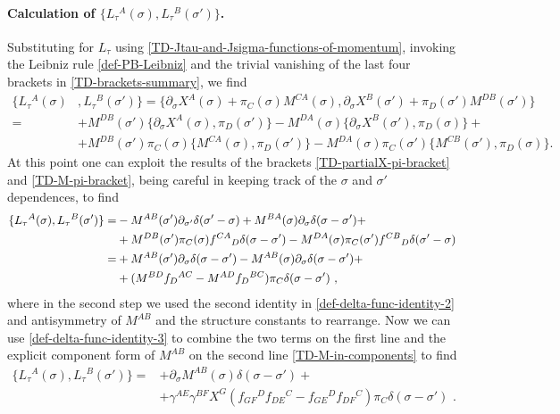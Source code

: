 \documentclass[12pt]{article}
\numberwithin{equation}{section}
\begin{document}
\paragraph{Calculation of $\{ L_{\tau}{}^{A}(\sigma),L_{\tau}{}^{B}(\sigma') \}$.} Substituting for $L_{\tau}$ using \eqref{TD-Jtau-and-Jsigma-functions-of-momentum}, invoking the Leibniz rule \eqref{def-PB-Leibniz} and the trivial vanishing of the last four brackets in \eqref{TD-brackets-summary}, we find
\begin{equation}
\begin{aligned}
\!\!\{ L_{\tau}{}^{A}(\sigma)&,L_{\tau}{}^{B}(\sigma') \} = \{\partial_{\sigma}X^{A}(\sigma)+\pi_{C}(\sigma)M^{CA}(\sigma) , \partial_{\sigma}X^{B}(\sigma')+\pi_{D}(\sigma')M^{DB}(\sigma') \}
\\
=& +M^{DB}(\sigma')\{ \partial_{\sigma}X^{A}(\sigma), \pi_{D}(\sigma') \}-M^{DA}(\sigma)\{ \partial_{\sigma}X^{B}(\sigma'), \pi_{D}(\sigma) \}+
\\&+M^{DB}(\sigma')\pi_{C}(\sigma)\{M^{CA}(\sigma),\pi_{D}(\sigma')\}-M^{DA}(\sigma)\pi_{C}(\sigma')\{M^{CB}(\sigma'),\pi_{D}(\sigma)\}  .
\end{aligned}
\end{equation}
At this point one can exploit the results of the brackets \eqref{TD-partialX-pi-bracket} and \eqref{TD-M-pi-bracket}, being careful in keeping track of the $\sigma$ and $\sigma'$ dependences, to find
\begin{align}
\{ L_{\tau}{}^{A}(\sigma), L_{\tau}{}^{B}(\sigma') \} =&-M^{AB}(\sigma')\partial_{\sigma'}\delta(\sigma'-\sigma)+M^{BA}(\sigma)\partial_{\sigma}\delta(\sigma-\sigma')+
\notag \\
&+M^{DB}(\sigma')\pi_{C}(\sigma)f^{CA}{}_{D}\delta(\sigma-\sigma')-M^{DA}(\sigma)\pi_{C}(\sigma')f^{CB}{}_{D}\delta(\sigma'-\sigma)
\notag \\
=& +M^{AB}(\sigma')\partial_{\sigma}\delta(\sigma-\sigma')-M^{AB}(\sigma)\partial_{\sigma}\delta(\sigma-\sigma')+
\notag \\
&+(M^{BD}f_{D}{}^{AC}-M^{AD}f_{D}{}^{BC})\pi_{C}\delta(\sigma-\sigma') \,\, ,
\end{align}
where in the second step we used the second identity in \eqref{def-delta-func-identity-2} and antisymmetry of $M^{AB}$ and the structure constants to rearrange. Now we can use \eqref{def-delta-func-identity-3} to combine the two terms on the first line and the explicit component form of $M^{AB}$ on the second line \eqref{TD-M-in-components} to find
\begin{equation}
\begin{aligned}
\{ L_{\tau}{}^{A}(\sigma),L_{\tau}{}^{B}(\sigma') \} =&+\partial_{\sigma}M^{AB}(\sigma) \delta(\sigma-\sigma')+
\\
&+\gamma^{AE}\gamma^{BF}X^{G}(f_{GF}{}^{D}f_{DE}{}^{C}-f_{GE}{}^{D}f_{DF}{}^{C})\pi_{C}\delta(\sigma-\sigma') \,\, .
\end{aligned}
\end{equation}
\end{document}
